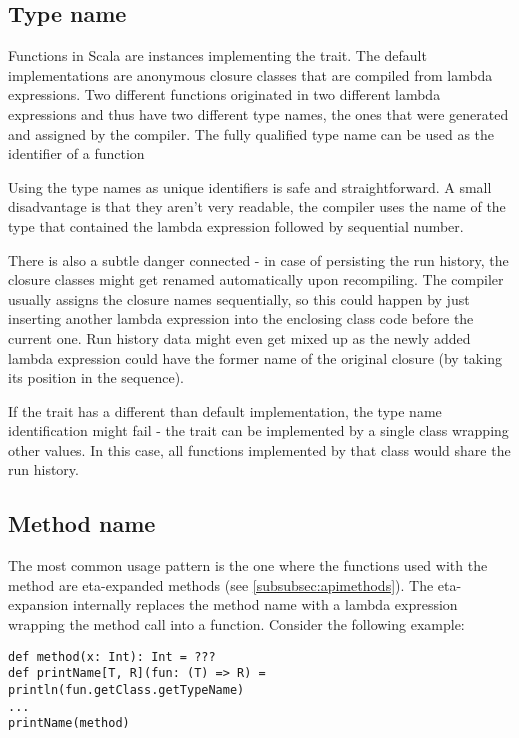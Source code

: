 \subsection{Type name}

Functions in Scala are instances implementing the  trait. The default implementations are anonymous closure classes that are compiled from lambda expressions. Two different functions originated in two different lambda expressions and thus have two different type names, the ones that were generated and assigned by the compiler. The fully qualified type name can be used as the identifier of a function

Using the type names as unique identifiers is safe and straightforward. A small disadvantage is that they aren't very readable, the compiler uses the name of the type that contained the lambda expression followed by sequential number. 

There is also a subtle danger connected - in case of persisting the run history, the closure classes might get renamed automatically upon recompiling. The compiler usually assigns the closure names sequentially, so this could happen by just inserting another lambda expression into the enclosing class code before the current one. Run history data might even get mixed up as the newly added lambda expression could have the former name of the original closure (by taking its position in the sequence).

If the  trait has a different than default implementation, the type name identification might fail - the trait can be implemented by a single class wrapping other values. In this case, all functions implemented by that class would share the run history.

\subsection{Method name}
\label{subsec:methodnameident}

The most common usage pattern is the one where the functions used with the  method are eta-expanded methods (see \ref{subsubsec:apimethods}). The eta-expansion internally replaces the method name with a lambda expression wrapping the method call into a function. Consider the following example:

\lstset{style=Scala}
\begin{lstlisting}
def method(x: Int): Int = ???
def printName[T, R](fun: (T) => R) =
println(fun.getClass.getTypeName)
...
printName(method)
\end{lstlisting}

